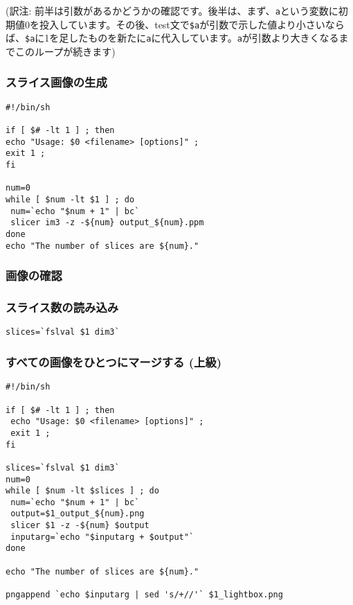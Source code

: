 \documentclass{jsarticle}
\begin{document}
\noindent (訳注: 前半は引数があるかどうかの確認です。後半は、まず、{\tt a}という変数に初期値0を投入しています。その後、test文で{\tt \$a}が引数で示した値より小さいならば、{\tt \$a}に1を足したものを新たに{\tt a}に代入しています。{\tt a}が引数より大きくなるまでこのループが続きます)

\subsubsection{スライス画像の生成}

\begin{verbatim}
#!/bin/sh

if [ $# -lt 1 ] ; then
echo "Usage: $0 <filename> [options]" ;
exit 1 ;
fi

num=0
while [ $num -lt $1 ] ; do
 num=`echo "$num + 1" | bc`
 slicer im3 -z -${num} output_${num}.ppm
done
echo "The number of slices are ${num}."
\end{verbatim}

\subsubsection{画像の確認}

\subsubsection{スライス数の読み込み}

\begin{verbatim}
slices=`fslval $1 dim3`
\end{verbatim}

\subsubsection{すべての画像をひとつにマージする (上級)}

\begin{verbatim}
#!/bin/sh

if [ $# -lt 1 ] ; then
 echo "Usage: $0 <filename> [options]" ;
 exit 1 ;
fi

slices=`fslval $1 dim3`
num=0
while [ $num -lt $slices ] ; do
 num=`echo "$num + 1" | bc`
 output=$1_output_${num}.png
 slicer $1 -z -${num} $output
 inputarg=`echo "$inputarg + $output"`
done

echo "The number of slices are ${num}."

pngappend `echo $inputarg | sed 's/+//'` $1_lightbox.png
\end{verbatim}
\end{document}
